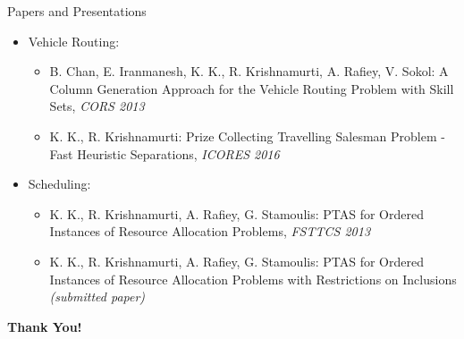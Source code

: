 \begin{frame}[t]{Papers and Presentations}
    \begin{itemize}
        \item Vehicle Routing:
            \begin{itemize}
                \item B. Chan, E. Iranmanesh, K. K., R. Krishnamurti, A. Rafiey, V. Sokol: \alert{A Column Generation Approach for the Vehicle Routing Problem with Skill Sets}, \emph{CORS 2013}
                \item K. K., R. Krishnamurti: \alert{Prize Collecting Travelling Salesman Problem - Fast Heuristic Separations}, \emph{ICORES 2016}
    \end{itemize}
    \item Scheduling:
        \begin{itemize}
            \item K. K., R. Krishnamurti, A. Rafiey, G. Stamoulis: \alert{PTAS for Ordered Instances of Resource Allocation Problems}, \emph{FSTTCS 2013}
            \item K. K., R. Krishnamurti, A. Rafiey, G. Stamoulis: \alert{PTAS for Ordered Instances of Resource Allocation Problems with Restrictions on Inclusions} \emph{(submitted paper)} 
        \end{itemize}
    \end{itemize}
\end{frame}
\begin{frame}[t,plain]
    \begin{center}
        \vspace{4cm}
        {\LARGE \textbf{Thank You!}}
    \end{center}
\end{frame}